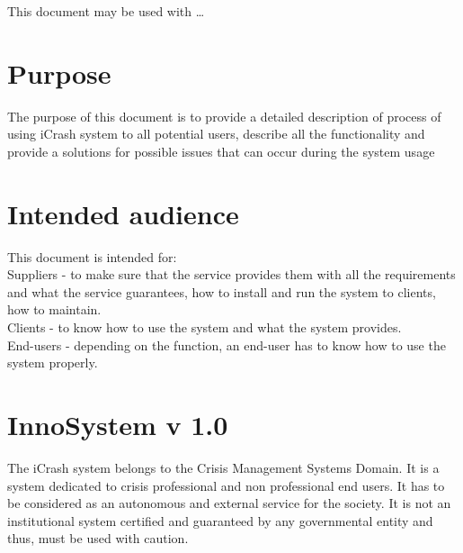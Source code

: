  
This document may be used with \ldots




\section{Purpose}
The purpose of this document is to provide a detailed description of process of using iCrash system to all potential users, describe all the functionality and provide a solutions for possible issues that can occur during the system usage 


\section{Intended audience}

This document is intended for:\\
Suppliers - to make sure that the service provides them with all the
requirements and what the service guarantees, how to install and run the system to clients,
how to maintain.\\ 
Clients  - to know how to use the system and what the system provides.\\ 
End-users - depending on the function, an end-user has to know how to use the
system properly.


\section{InnoSystem v 1.0}
The iCrash system belongs to the Crisis Management Systems Domain. It is a
system dedicated to crisis professional and non professional end users. It has
to be considered as an autonomous and external service for the society. It is not an institutional system certified and guaranteed by any governmental entity and thus, must be used with caution.\\


